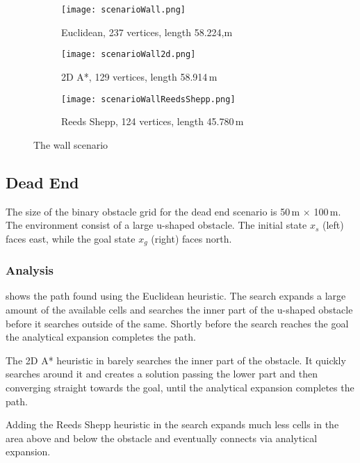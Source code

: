 \begin{figure}[h]
    \centering
    \begin{subfigure}[t]{\textwidth}
        \texttt{[image: scenarioWall.png]}
        \caption{Euclidean, 237 vertices, length 58.224,m}
        \label{fig:scenarioWall}
    \end{subfigure}
    \begin{subfigure}[t]{\textwidth}
        \texttt{[image: scenarioWall2d.png]}
        \caption{2D A*, 129 vertices, length 58.914\,m}
        \label{fig:scenarioWall2d}
    \end{subfigure}    
    \begin{subfigure}[t]{\textwidth}
        \texttt{[image: scenarioWallReedsShepp.png]}
        \caption{Reeds Shepp, 124 vertices, length 45.780\,m}
        \label{fig:scenarioWallReedsShepp}
    \end{subfigure}
    \caption{The wall scenario}
    \label{fig:scenarioWall}
\end{figure}

\subsection{Dead End}
The size of the binary obstacle grid for the dead end scenario is 50\,m $\times$ 100\,m. The environment consist of a large u-shaped obstacle. The initial state $x_s$ (left) faces east, while the goal state $x_g$ (right) faces north.

\subsubsection{Analysis}

 shows the path found using the Euclidean heuristic. The search expands a large amount of the available cells and searches the inner part of the u-shaped obstacle before it searches outside of the same. Shortly before the search reaches the goal the analytical expansion completes the path.

The 2D A* heuristic in  barely searches the inner part of the obstacle. It quickly searches around it and creates a solution passing the lower part and then converging straight towards the goal, until the analytical expansion completes the path.

Adding the Reeds Shepp heuristic in  the search expands much less cells in the area above and below the obstacle and eventually connects via analytical expansion.

